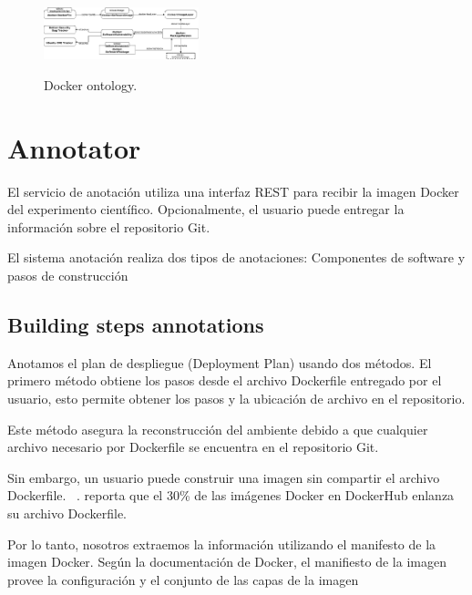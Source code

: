 \begin{figure}
  \caption{Docker ontology.}
  \centering
    \includegraphics[width=0.4\textwidth]{Figures/dockerOntologyBasic.png}
    \label{fig:ontology}
\end{figure}



\section{Annotator}\label{s4.2}

El servicio de anotación utiliza una interfaz REST para recibir la imagen Docker del experimento científico. Opcionalmente, el usuario puede entregar la información sobre el repositorio Git.  

 El sistema anotación realiza dos tipos de anotaciones: Componentes de software y pasos de construcción 

 
\subsection{Building steps annotations}\label{s4.2.1}

Anotamos el plan de despliegue (Deployment Plan) usando dos métodos. El primero método obtiene los pasos desde el archivo Dockerfile entregado por el usuario, esto permite obtener los pasos y la ubicación de archivo en el repositorio. 

Este método asegura la reconstrucción del ambiente debido a que cualquier archivo necesario por Dockerfile se encuentra en el repositorio Git.

Sin embargo, un usuario puede construir una imagen sin compartir el archivo Dockerfile. ~\cite{}. reporta que el 30\% de las imágenes Docker en DockerHub enlanza su archivo Dockerfile. 

Por lo tanto, nosotros extraemos la información utilizando el manifesto de la imagen Docker. Según la documentación de Docker, el manifiesto de la imagen provee la configuración y el conjunto de las capas de la imagen

